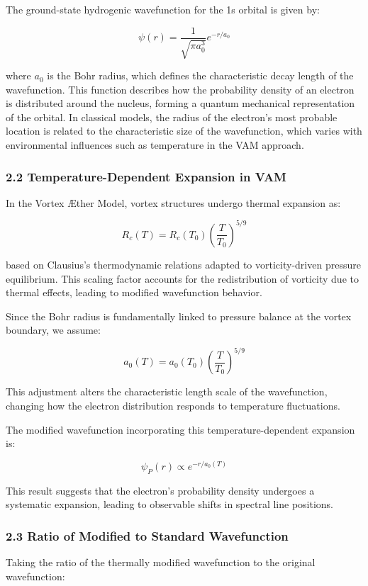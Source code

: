 The ground-state hydrogenic wavefunction for the 1s orbital is given by:

\[ \psi(r) = \frac{1}{\sqrt{\pi a_0^3}} e^{-r/a_0} \]

where \( a_0 \) is the Bohr radius, which defines the characteristic decay length of the wavefunction. This function describes how the probability density of an electron is distributed around the nucleus, forming a quantum mechanical representation of the orbital. In classical models, the radius of the electron's most probable location is related to the characteristic size of the wavefunction, which varies with environmental influences such as temperature in the VAM approach.

\subsubsection*{2.2 Temperature-Dependent Expansion in VAM}

In the Vortex Æther Model, vortex structures undergo thermal expansion as:

\[ R_c(T) = R_c (T_0) \left( \frac{T}{T_0} \right)^{5/9} \]

based on Clausius’s thermodynamic relations adapted to vorticity-driven pressure equilibrium. This scaling factor accounts for the redistribution of vorticity due to thermal effects, leading to modified wavefunction behavior.

Since the Bohr radius is fundamentally linked to pressure balance at the vortex boundary, we assume:

\[ a_0(T) = a_0 (T_0) \left( \frac{T}{T_0} \right)^{5/9} \]

This adjustment alters the characteristic length scale of the wavefunction, changing how the electron distribution responds to temperature fluctuations.

The modified wavefunction incorporating this temperature-dependent expansion is:

\[ \psi_P(r) \propto e^{-r/a_0(T)} \]

This result suggests that the electron’s probability density undergoes a systematic expansion, leading to observable shifts in spectral line positions.


\subsubsection*{2.3 Ratio of Modified to Standard Wavefunction}

Taking the ratio of the thermally modified wavefunction to the original wavefunction:

